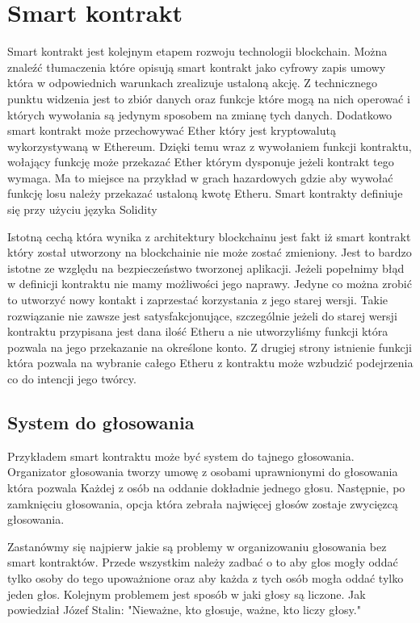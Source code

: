 \documentclass[]{llncs}
\begin{document}
\section{Smart kontrakt}

  Smart kontrakt jest kolejnym etapem rozwoju technologii blockchain. Można
  znaleźć tłumaczenia które opisują smart kontrakt jako cyfrowy zapis umowy
  która w odpowiednich warunkach zrealizuje ustaloną akcję. Z technicznego
  punktu widzenia jest to zbiór danych oraz funkcje które mogą na nich operować
  i których wywołania są jedynym sposobem na zmianę tych danych. Dodatkowo smart
  kontrakt może przechowywać Ether który jest kryptowalutą wykorzystywaną w
  Ethereum. Dzięki temu wraz z wywołaniem funkcji kontraktu, wołający funkcję
  może przekazać Ether którym dysponuje jeżeli kontrakt tego wymaga. Ma to
  miejsce na przykład w grach hazardowych gdzie aby wywołać funkcję losu należy
  przekazać ustaloną kwotę Etheru. Smart kontrakty definiuje się przy użyciu
  języka Solidity\cite{solidity}

  Istotną cechą która wynika z architektury blockchainu jest fakt iż smart
  kontrakt który został utworzony na blockchainie nie może zostać zmieniony.
  Jest to bardzo istotne ze względu na bezpieczeństwo tworzonej aplikacji.
  Jeżeli popełnimy błąd w definicji kontraktu nie mamy możliwości jego naprawy.
  Jedyne co można zrobić to utworzyć nowy kontakt i zaprzestać korzystania z
  jego starej wersji. Takie rozwiązanie nie zawsze jest satysfakcjonujące,
  szczególnie jeżeli do starej wersji kontraktu przypisana jest dana ilość
  Etheru a nie utworzyliśmy funkcji która pozwala na jego przekazanie na
  określone konto. Z drugiej strony istnienie funkcji która pozwala na wybranie
  całego Etheru z kontraktu może wzbudzić podejrzenia co do intencji jego
  twórcy.

\subsection{System do głosowania}

  Przykładem smart kontraktu może być system do tajnego głosowania. Organizator
  głosowania tworzy umowę z osobami uprawnionymi do głosowania która pozwala
  Każdej z osób na oddanie dokładnie jednego głosu. Następnie, po zamknięciu
  głosowania, opcja która zebrała najwięcej głosów zostaje zwycięzcą głosowania.

  Zastanówmy się najpierw jakie są problemy w organizowaniu głosowania bez smart
  kontraktów. Przede wszystkim należy zadbać o to aby głos mogły oddać tylko
  osoby do tego upoważnione oraz aby każda z tych osób mogła oddać tylko jeden
  głos. Kolejnym problemem jest sposób w jaki głosy są liczone. Jak powiedział
  Józef Stalin: "Nieważne, kto głosuje, ważne, kto liczy głosy."
\end{document}
